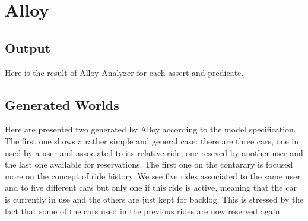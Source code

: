 \pagebreak
\section{Alloy}


\pagebreak
\subsection{Output}
Here is the result of Alloy Analyzer for each assert and predicate.


\pagebreak
\subsection{Generated Worlds}
Here are presented two generated by Alloy according to the model specification.
The first one shows a rather simple and general case: there are three cars,
one in used by a user and associated to its relative ride,
one reseved by another user and the last one available for reservations.
The first one on the contarary is focused more on the concept of ride history.
We see five rides associated to the same user and to five different cars
but only one if this ride is active, meaning that the car is currently in use and the
others are just kept for backlog. This is stressed by the fact that some of the cars used 
in the previous rides are now reserved again.


